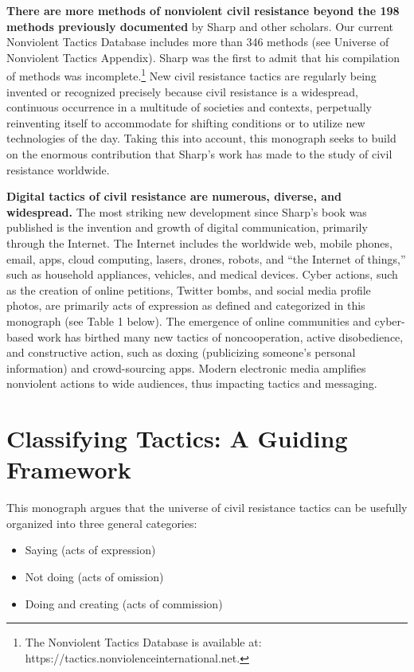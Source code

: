\documentclass[twoside,a4paper,12pt,fleqn,openany]{extbook}
\begin{document}
\textbf{There are more methods of nonviolent civil resistance beyond the 198 methods previously documented} by Sharp and other scholars. Our current Nonviolent Tactics Database includes more than 346 methods (see Universe of Nonviolent Tactics Appendix). Sharp was the first to admit that his compilation of methods was incomplete.\footnote{The Nonviolent Tactics Database is available at: https://tactics.nonviolenceinternational.net.} New civil resistance tactics are regularly being invented or recognized precisely because civil resistance is a widespread, continuous occurrence in a multitude of societies and contexts, perpetually reinventing itself to accommodate for shifting conditions or to utilize new technologies of the day. Taking this into account, this monograph seeks to build on the enormous contribution that Sharp’s work has made to the study of civil resistance worldwide.

\textbf{Digital tactics of civil resistance are numerous, diverse, and widespread.} The most striking new development since Sharp’s book was published is the invention and growth of digital communication, primarily through the Internet. The Internet includes the worldwide web, mobile phones, email, apps, cloud computing, lasers, drones, robots, and “the Internet of things,” such as household appliances, vehicles, and medical devices. Cyber actions, such as the creation of online petitions, Twitter bombs, and social media profile photos, are primarily acts of expression as defined and categorized in this monograph (see Table 1 below). The emergence of online communities and cyber-based work has birthed many new tactics of noncooperation, active disobedience, and constructive action, such as doxing (publicizing someone’s personal information) and crowd-sourcing apps. Modern electronic media amplifies nonviolent actions to wide audiences, thus impacting tactics and messaging.

\section*{Classifying Tactics: A Guiding Framework}

This monograph argues that the universe of civil resistance tactics can be usefully organized
into three general categories:

\begin{itemize}
\item Saying (acts of expression)
\item Not doing (acts of omission)
\item Doing and creating (acts of commission)
\end{itemize}
\end{document}
